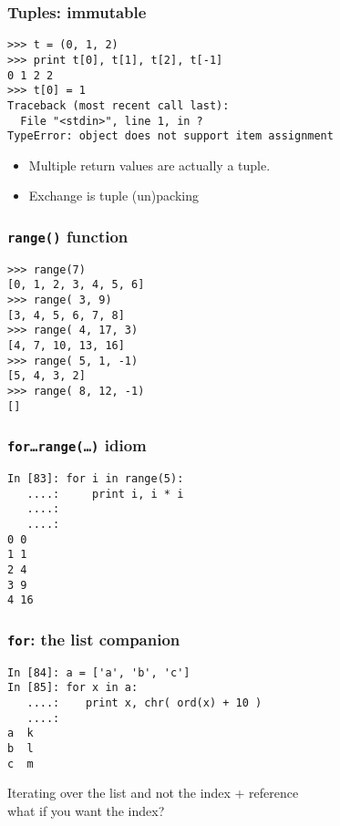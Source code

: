 \documentclass[14pt,compress]{beamer}
\newcounter{time}
\newcommand{\inctime}[1]{\addtocounter{time}{#1}{\tiny \thetime\ m}}
\newcommand{\typ}[1]{\texttt{#1}}
\begin{document}

\begin{frame}[fragile]
  \frametitle{Tuples: immutable}
\begin{lstlisting}
>>> t = (0, 1, 2)
>>> print t[0], t[1], t[2], t[-1] 
0 1 2 2
>>> t[0] = 1
Traceback (most recent call last):
  File "<stdin>", line 1, in ?
TypeError: object does not support item assignment
\end{lstlisting}  
\begin{itemize}
    \item Multiple return values are actually a tuple.
    \item Exchange is tuple (un)packing
\end{itemize}
\inctime{5}
\end{frame}


\begin{frame}[fragile]
  \frametitle{\typ{range()} function}
  \begin{lstlisting}
>>> range(7)
[0, 1, 2, 3, 4, 5, 6]
>>> range( 3, 9)
[3, 4, 5, 6, 7, 8]
>>> range( 4, 17, 3)
[4, 7, 10, 13, 16]
>>> range( 5, 1, -1)
[5, 4, 3, 2]
>>> range( 8, 12, -1)
[]
  \end{lstlisting}
\end{frame}

\begin{frame}[fragile]
  \frametitle{\typ{for\ldots range(\ldots)} idiom}
  \begin{lstlisting}
In [83]: for i in range(5):
   ....:     print i, i * i
   ....:     
   ....:     
0 0
1 1
2 4
3 9
4 16
\end{lstlisting}
\end{frame}

\begin{frame}[fragile]
  \frametitle{\typ{for}: the list companion}
  
  \begin{lstlisting}
In [84]: a = ['a', 'b', 'c']
In [85]: for x in a:
   ....:    print x, chr( ord(x) + 10 )
   ....:
a  k
b  l
c  m
  \end{lstlisting}
  Iterating over the list and not the index + reference\\
  what if you want the index?
\end{frame}
\end{document}
